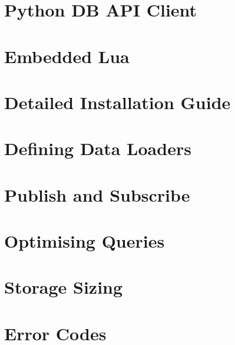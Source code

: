 \documentclass{scrreprt}
\begin{document}
\chapter{Python DB API Client}\label{chpt_papiclient}




\chapter{Embedded Lua}\label{chpt_luaemb}


\chapter{Detailed Installation Guide}\label{chpt_install}

\chapter{Defining Data Loaders}\label{chpt_loader}

\chapter{Publish and Subscribe}\label{chpt_pubsub}

\chapter{Optimising Queries}\label{chpt_opt}


\chapter{Storage Sizing}\label{chpt_sizing}

\chapter{Error Codes}\label{chpt_errors}

\end{document}
